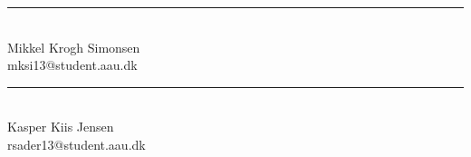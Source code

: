 \hspace{1.5\baselineskip}
\hspace{1.5\baselineskip}

\vspace{1.5\baselineskip}

\begin{minipage}[b]{0.45\textwidth}
 \centering
 \rule{\textwidth}{0.45pt}\\
  Mikkel Krogh Simonsen\\
 {\footnotesize mksi13@student.aau.dk}
\end{minipage}
\vspace{1.5\baselineskip}
\hfill
\begin{minipage}[b]{0.45\textwidth}
 \centering
 \rule{\textwidth}{0.45pt}\\
  Kasper Kiis Jensen\\
 {\footnotesize rsader13@student.aau.dk}
\end{minipage}

